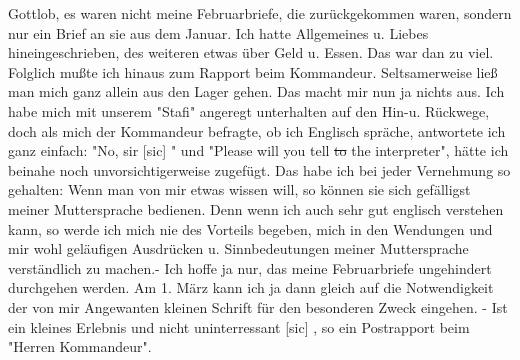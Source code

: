 \def\day{17. Februar 1944.}
\mktitle

Gottlob, es waren nicht meine Februarbriefe, die zur\"{u}ckgekommen waren, sondern nur ein Brief an sie aus dem Januar.
Ich hatte Allgemeines u. Liebes hineingeschrieben, des weiteren etwas \"{u}ber Geld u. Essen.
Das war dan zu viel.
Folglich mu{\ss}te ich hinaus zum Rapport beim Kommandeur.
Seltsamerweise lie{\ss} man mich ganz allein aus den Lager gehen.
Das macht mir nun ja nichts aus.
Ich habe mich mit unserem "Stafi" angeregt unterhalten auf den Hin-u. R\"{u}ckwege, doch als mich der Kommandeur befragte, ob ich Englisch spr\"{a}che, antwortete ich ganz einfach: "No, sir{\color{red} [sic] }" und "Please will you tell \st{to} the interpreter", h\"{a}tte ich beinahe noch unvorsichtigerweise zugef\"{u}gt.
Das habe ich bei jeder Vernehmung so gehalten: Wenn man von mir etwas wissen will, so k\"{o}nnen sie sich gef\"{a}lligst meiner Muttersprache bedienen.
Denn wenn ich auch sehr gut englisch verstehen kann, so werde ich mich nie des Vorteils begeben, mich in den Wendungen und mir wohl gel\"{a}ufigen Ausdr\"{u}cken u. Sinnbedeutungen meiner Muttersprache verst\"{a}ndlich zu machen.-
Ich hoffe ja nur, das meine Februarbriefe ungehindert durchgehen werden.
Am 1. M\"{a}rz kann ich ja dann gleich auf die Notwendigkeit der von mir Angewanten kleinen Schrift f\"{u}r den besonderen Zweck eingehen.
- Ist ein kleines Erlebnis und nicht uninterressant{\color{red} [sic] }, so ein Postrapport beim "Herren Kommandeur".

\clearpage
